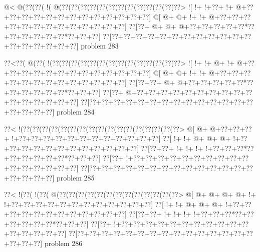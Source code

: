 \vbox{\vbox{\goo
\- @<\- @(\0??(\0??(\- !(\- @(\0??(\0??(\0??(\0??(\0??(\0??(\0??(\0??(\0??(\0??(\0??(\0??(\0??>
\- ![\- !+\- !+\0??+\- !+\- @+\0??+\0??+\0??+\0??+\0??+\0??+\0??+\0??+\0??+\0??+\0??+\0??+\0??]
\- @[\- @+\- @+\- !+\- !+\- @+\0??+\0??+\0??+\0??+\0??+\0??+\0??+\0??+\0??+\0??+\0??+\0??+\0??]
\0??[\0??+\- @+\- @+\- @+\0??+\0??+\0??+\0??+\0??*\0??+\0??+\0??+\0??+\0??+\0??*\0??+\0??+\0??]
\0??[\0??+\0??+\0??+\0??+\0??+\0??+\0??+\0??+\0??+\0??+\0??+\0??+\0??+\0??+\0??+\0??+\0??+\0??]
}
\hfil problem 283\hfil\break
}



\vbox{\vbox{\goo
\0??<\0??(\- @(\0??(\- !(\0??(\0??(\0??(\0??(\0??(\0??(\0??(\0??(\0??(\0??(\0??(\0??(\0??(\0??>
\- ![\- !+\- !+\- @+\- !+\- @+\0??+\0??+\0??+\0??+\0??+\0??+\0??+\0??+\0??+\0??+\0??+\0??+\0??]
\- @[\- @+\- @+\- !+\- !+\- @+\0??+\0??+\0??+\0??+\0??+\0??+\0??+\0??+\0??+\0??+\0??+\0??+\0??]
\0??[\0??+\0??+\- @+\- @+\0??+\0??+\0??+\0??+\0??*\0??+\0??+\0??+\0??+\0??+\0??*\0??+\0??+\0??]
\0??[\0??+\- @+\0??+\0??+\0??+\0??+\0??+\0??+\0??+\0??+\0??+\0??+\0??+\0??+\0??+\0??+\0??+\0??]
\0??[\0??+\0??+\0??+\0??+\0??+\0??+\0??+\0??+\0??+\0??+\0??+\0??+\0??+\0??+\0??+\0??+\0??+\0??]
}
\hfil problem 284\hfil\break
}



\vbox{\vbox{\goo
\0??<\- !(\0??(\0??(\0??(\0??(\0??(\0??(\0??(\0??(\0??(\0??(\0??(\0??(\0??(\0??(\0??(\0??(\0??>
\- @[\- @+\- @+\0??+\0??+\0??+\- !+\0??+\0??+\0??+\0??+\0??+\0??+\0??+\0??+\0??+\0??+\0??+\0??]
\0??[\- !+\- !+\- @+\- @+\- @+\- !+\0??+\0??+\0??+\0??+\0??+\0??+\0??+\0??+\0??+\0??+\0??+\0??]
\0??[\0??+\0??+\- !+\- !+\- !+\- !+\0??+\0??+\0??*\0??+\0??+\0??+\0??+\0??+\0??*\0??+\0??+\0??]
\0??[\0??+\- !+\0??+\0??+\0??+\0??+\0??+\0??+\0??+\0??+\0??+\0??+\0??+\0??+\0??+\0??+\0??+\0??]
\0??[\0??+\0??+\0??+\0??+\0??+\0??+\0??+\0??+\0??+\0??+\0??+\0??+\0??+\0??+\0??+\0??+\0??+\0??]
}
\hfil problem 285\hfil\break
}



\vbox{\vbox{\goo
\0??<\- !(\0??(\- !(\0??(\- @(\0??(\0??(\0??(\0??(\0??(\0??(\0??(\0??(\0??(\0??(\0??(\0??(\0??>
\- @[\- @+\- @+\- @+\- @+\- !+\- !+\0??+\0??+\0??+\0??+\0??+\0??+\0??+\0??+\0??+\0??+\0??+\0??]
\0??[\- !+\- !+\- @+\- @+\- @+\- !+\0??+\0??+\0??+\0??+\0??+\0??+\0??+\0??+\0??+\0??+\0??+\0??]
\0??[\0??+\0??+\- !+\- !+\- !+\- !+\0??+\0??+\0??*\0??+\0??+\0??+\0??+\0??+\0??*\0??+\0??+\0??]
\0??[\0??+\- !+\0??+\0??+\0??+\0??+\0??+\0??+\0??+\0??+\0??+\0??+\0??+\0??+\0??+\0??+\0??+\0??]
\0??[\0??+\0??+\0??+\0??+\0??+\0??+\0??+\0??+\0??+\0??+\0??+\0??+\0??+\0??+\0??+\0??+\0??+\0??]
}
\hfil problem 286\hfil\break
}



